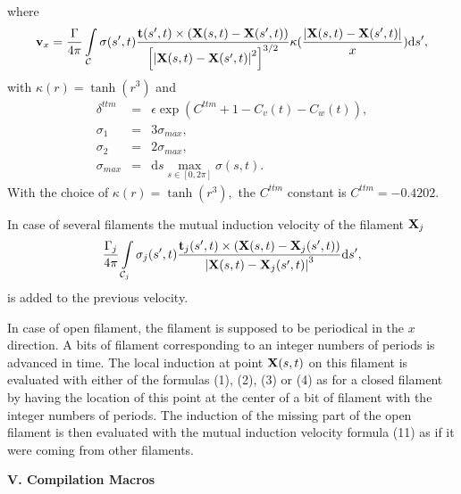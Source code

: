 \begin{list}{dummy}
where
	\begin{eqnarray}
 		\mbox{\bf v}_x=
		{\Gamma\over{4\pi}} \int\limits_{{\cal{C}}} \sigma(s',t)
		{\mbox{\bf t}(s',t)\times\left(\mbox{\bf X}(s,t)-\mbox{\bf X}(s',t)\right)
		\over{\left[\left| \mbox{\bf X}(s,t)- \mbox{\bf X}(s',t)\right|^2\right]}^{3/2}}
                  \kappa(\frac{\left|\mbox{\bf X}(s,t)-\mbox{\bf X}(s',t)\right|}{x})\mbox{d}s',
       \end{eqnarray}
with $\kappa(r)=\tanh(r^3)$ and 
      \begin{eqnarray}
	\label{loi3}
                  \delta^{ttm}&=&\epsilon\exp\left({C^{ttm}+1-C_v(t)-C_w(t)}\right),\\
                    \sigma_1&=& 3 \sigma_{max},\\
                    \sigma_2&=& 2 \sigma_{max},\\
                    \sigma_{max}&=& \mbox{d}s \max_{s\in[0,2\pi]} \sigma(s,t).
        \end{eqnarray}
With the choice of $\kappa(r)=\tanh(r^3),$ the $C^{ttm}$ constant is $C^{ttm}=-0.4202.$
\end{list}

In case of several filaments the mutual induction velocity of the filament $\mbox{\bf X}_j$
	\begin{eqnarray}
	\label{Burgers}
		{\Gamma_j\over{4\pi}} \int\limits_{{\cal{C}}_j} \sigma_j(s',t)
		{\mbox{\bf t}_j(s',t)\times\left(\mbox{\bf X}(s,t)-\mbox{\bf X}_j(s',t)\right)
		\over{\left| \mbox{\bf X}(s,t)- \mbox{\bf X}_j(s',t)\right|}^3}\mbox{d}s',
       \end{eqnarray}
is added to the previous velocity.

In case of open filament, the filament is supposed to be periodical in the $x$ direction. A bits of filament corresponding to an integer numbers of periods is advanced in time. The local induction at point $\mbox{\bf X}(s,t)$ on this filament is evaluated with either of the formulas (1), (2), (3) or (4) as for a closed filament by having the location of this point at the center of a bit of filament with the integer numbers of periods. The induction of the missing part of the open filament is then evaluated with the mutual induction velocity formula (11) as if it were coming from other filaments. 


\medskip
{\bf V.  Compilation Macros} 
\smallskip

